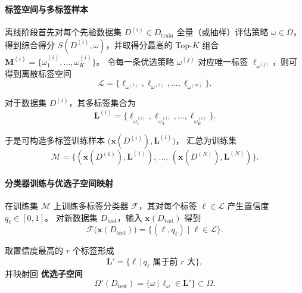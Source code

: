 \documentclass[10pt]{article} %
\numberwithin{equation}{section}
\begin{document}
\paragraph{标签空间与多标签样本}
离线阶段首先对每个先验数据集
$D^{(i)}\!\in\!D_{\text{train}}$ 全量（或抽样）评估策略
$\omega\!\in\!\Omega$，得到综合得分
$S(D^{(i)},\omega)$，并取得分最高的
Top-$K$ 组合  
$\mathbf{M}^{(i)}=\{\omega_1^{(i)},\dots,\omega_K^{(i)}\}$。
令每一条优选策略 $\omega^{(j)}$ 对应唯一标签
$\ell_{\omega^{(j)}}$，则可得到离散标签空间  
\begin{equation}\label{eq:label-space}
  \mathcal{L}=\{\ell_{\omega^{(1)}},\ell_{\omega^{(2)}},\dots,\ell_{\omega^{(m)}}\}.
\end{equation}

\noindent 对于数据集 $D^{(i)}$，其多标签集合为  
\begin{equation}\label{eq:multi-label-for-D}
  \mathbf{L}^{(i)}=
  \bigl\{\ell_{\omega_1^{(i)}},\ell_{\omega_2^{(i)}},\dots,\ell_{\omega_K^{(i)}}\bigr\}.
\end{equation}

\noindent 于是可构造多标签训练样本  
$\bigl(\mathbf{x}(D^{(i)}),\mathbf{L}^{(i)}\bigr)$，
汇总为训练集  
\begin{equation}\label{eq:training-set}
  \mathcal{M}=
  \bigl\{
    (\mathbf{x}(D^{(1)}),\mathbf{L}^{(1)}),\,\dots,\,
    (\mathbf{x}(D^{(N)}),\mathbf{L}^{(N)})
  \bigr\}.
\end{equation}

\paragraph{分类器训练与优选子空间映射}
在训练集 $\mathcal{M}$ 上训练多标签分类器 $\mathcal{F}$，其对每个标签 $\ell\!\in\!\mathcal{L}$ 产生置信度
$q_\ell\in[0,1]$。  
对新数据集 $D_{\text{test}}$，输入
${\mathbf{x}}(D_{\text{test}})$ 得到  
\begin{equation}\label{eq:classifier-output}
  \mathcal{F}\bigl(\mathbf{x}(D_{\text{test}})\bigr)
  =\bigl\{(\ell,q_\ell)\;\big|\;\ell\in\mathcal{L}\bigr\}.
\end{equation}

\noindent 取置信度最高的 $r$ 个标签形成  
\begin{equation}\label{eq:predicted-L}
  \mathbf{L}'=
  \{\ell\,|\,q_\ell\text{ 属于前 }r\text{ 大}\},
\end{equation}
并映射回 \textbf{优选子空间}  
\begin{equation}\label{eq:Omega-prime}
  \Omega'(D_{\text{test}})=
  \{\omega\,|\,\ell_{\omega}\in\mathbf{L}'\}\subset\Omega.
\end{equation}
\end{document}
